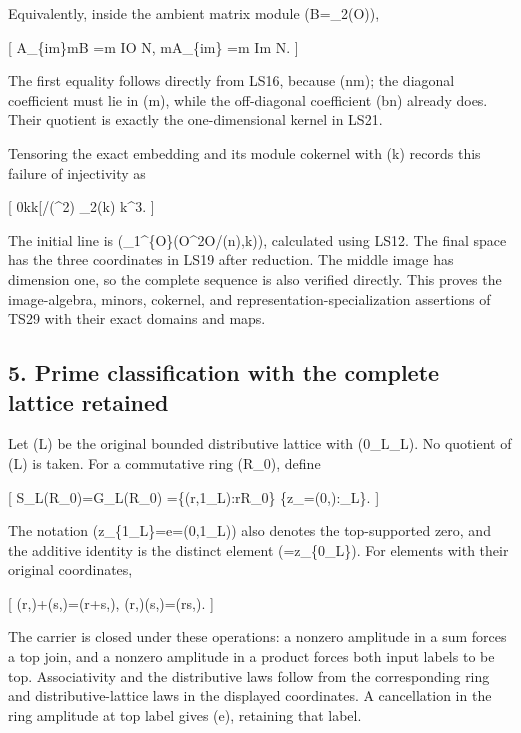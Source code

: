 \documentclass[
]{article}
\begin{document}
Equivalently, inside the ambient matrix module
(\mathcal B=\_2(\mathcal O)),

{[} \mathcal A\_\{\rm im\}\cap\mathfrak m\mathcal B =\mathfrak m
I\oplus\mathcal O N, \qquad \mathfrak m\mathcal A\_\{\rm im\}
=\mathfrak m I\oplus\mathfrak m N.  {]}

The first equality follows directly from LS16, because
(n\in\mathfrak m); the diagonal coefficient must lie in (\mathfrak m),
while the off-diagonal coefficient (bn) already does. Their quotient is
exactly the one-dimensional kernel in LS21.

Tensoring the exact embedding and its module cokernel with (k) records
this failure of injectivity as

{[} 0\longrightarrow k\eta \longrightarrow k{[}\eta{]}/(\eta\^{}2)
\xrightarrow{\ \rho_*\ }\_2(k)
\longrightarrow k\^{}3.  {]}

The initial line is
(\_1\^{}\{\mathcal O\}(\mathcal O\^{}2\oplus\mathcal O/(n),k)),
calculated using LS12. The final space has the three coordinates in LS19
after reduction. The middle image has dimension one, so the complete
sequence is also verified directly. This proves the image-algebra,
minors, cokernel, and representation-specialization assertions of TS29
with their exact domains and maps.

\subsection{5. Prime classification with the complete lattice
retained}\label{prime-classification-with-the-complete-lattice-retained}

Let (L) be the original bounded distributive lattice with (0\_L\_L).
No quotient of (L) is taken. For a commutative ring (R\_0), define

{[} S\_L(R\_0)=G\_L(R\_0) =\{(r,1\_L):r\in R\_0\}
\cup\{z\_\lambda=(0,\lambda):\lambda{}\_L\}.  {]}

The notation (z\_\{1\_L\}=e=(0,1\_L)) also denotes the top-supported
zero, and the additive identity is the distinct element
(\tau=z\_\{0\_L\}). For elements with their original coordinates,

{[} (r,\lambda)+(s,\mu)=(r+s,\lambda\vee\mu), \qquad
(r,\lambda)(s,\mu)=(rs,\lambda\wedge\mu).  {]}

The carrier is closed under these operations: a nonzero amplitude in a
sum forces a top join, and a nonzero amplitude in a product forces both
input labels to be top. Associativity and the distributive laws follow
from the corresponding ring and distributive-lattice laws in the
displayed coordinates. A cancellation in the ring amplitude at top label
gives (e), retaining that label.
\end{document}

